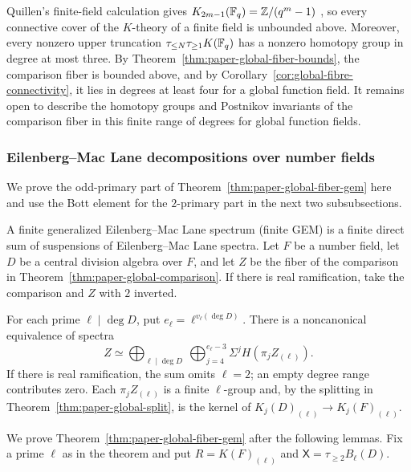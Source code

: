 \begin{remark}
Quillen's finite-field calculation gives $K_{2m-1}(\mathbb F_q)=\mathbb Z/(q^m-1)$ \cite{QuillenFinite}, so every connective cover of the $K$-theory of a finite field is unbounded above.
Moreover, every nonzero upper truncation $\tau_{\le N}\tau_{\ge1}K(\mathbb F_q)$ has a nonzero homotopy group in degree at most three.
By Theorem~\ref{thm:paper-global-fiber-bounds}, the comparison fiber is bounded above, and by Corollary~\ref{cor:global-fibre-connectivity}, it lies in degrees at least four for a global function field.
It remains open to describe the homotopy groups and Postnikov invariants of the comparison fiber in this finite range of degrees for global function fields.
\end{remark}

\subsubsection{Eilenberg--Mac Lane decompositions over number fields}\label{subsec:paper-global-fiber-gem}
We prove the odd-primary part of Theorem~\ref{thm:paper-global-fiber-gem} here and use the Bott element for the $2$-primary part in the next two subsubsections.

A finite generalized Eilenberg--Mac Lane spectrum (finite GEM) is a finite direct sum of suspensions of Eilenberg--Mac Lane spectra.
Let $F$ be a number field, let $D$ be a central division algebra over $F$, and let $Z$ be the fiber of the comparison in Theorem~\ref{thm:paper-global-comparison}.
If there is real ramification, take the comparison and $Z$ with $2$ inverted.

\begin{theorem}\label{thm:paper-global-fiber-gem}
For each prime $\ell\mid\deg D$, put $e_\ell=\ell^{v_\ell(\deg D)}$.
There is a noncanonical equivalence of spectra
\[
 Z \simeq
 \bigoplus_{\ell\mid\deg D}\ \bigoplus_{j=4}^{e_\ell-3}
           \Sigma^j H(\pi_jZ_{(\ell)}).
\]
If there is real ramification, the sum omits $\ell=2$; an empty degree range contributes zero.
Each $\pi_jZ_{(\ell)}$ is a finite $\ell$-group and, by the splitting in Theorem~\ref{thm:paper-global-split}, is the kernel of $K_j(D)_{(\ell)}\to K_j(F)_{(\ell)}$.
\end{theorem}

We prove Theorem~\ref{thm:paper-global-fiber-gem} after the following lemmas.
Fix a prime $\ell$ as in the theorem and put $R=K(F)_{(\ell)}$ and $\mathsf{X}=\tau_{\ge2}B_\ell(D)$.

